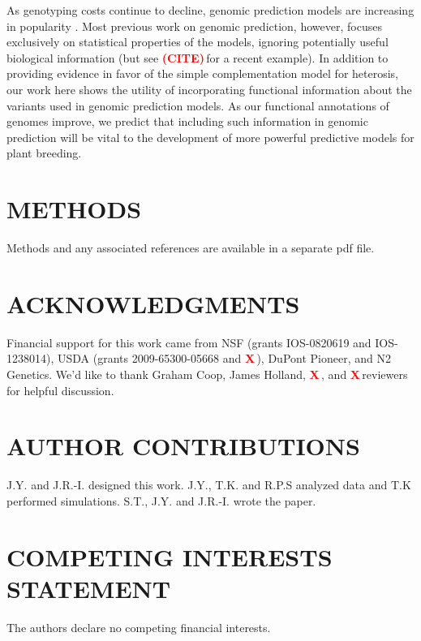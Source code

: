 \documentclass[twoside,twocolumn, letterpaper]{article}
\renewcommand{\baselinestretch}{1}
\newcommand{\X}{\textcolor{red}{\bf X\,}}
\newcommand{\citex}{\textcolor{red}{\bf (CITE)\,}}
\begin{document}
As genotyping costs continue to decline, genomic prediction models are increasing in popularity \citep{desta2014genomic}. 
Most previous work on genomic prediction, however, focuses exclusively on statistical properties of the models, ignoring potentially useful biological information (but see \citex for a recent example). 
In addition to providing evidence in favor of the simple complementation model for heterosis, our work here shows the utility of incorporating functional information about the variants used in genomic prediction models.  
As our functional annotations of genomes improve, we predict that including such information in genomic prediction will be vital to the development of more powerful predictive models for plant breeding.

\section*{METHODS}
Methods and any associated references are available in a separate pdf file.

\section*{ACKNOWLEDGMENTS}
Financial support for this work came from NSF (grants IOS-0820619 and IOS-1238014), USDA (grants 2009-65300-05668 and \X), DuPont Pioneer, and N2 Genetics. We'd like to thank Graham Coop, James Holland, \X, and \X reviewers for helpful discussion.

\section*{AUTHOR CONTRIBUTIONS}
J.Y. and J.R.-I. designed this work. J.Y., T.K. and R.P.S analyzed data and T.K performed simulations. S.T., J.Y. and J.R.-I. wrote the paper.

\section*{COMPETING INTERESTS STATEMENT}
The authors declare no competing financial interests.

{\scriptsize \sf
\renewcommand{\baselinestretch}{2.0}


}
\end{document}
